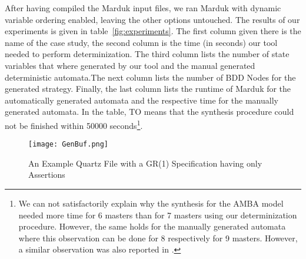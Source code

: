 \documentclass[submission,copyright,creativecommons]{eptcs}
\begin{document}
After having compiled the Marduk input files, we ran Marduk with dynamic variable ordering enabled, leaving the other options untouched. The results of our experiments is given in table~\ref{fig:experiments}. The first column given there is the name of the case study, the second column is the time (in seconds) our tool needed to perform determinization. The third column lists the number of state variables that where generated by our tool and the manual generated deterministic automata.The next column lists the number of BDD Nodes for the generated strategy. Finally, the last column lists the runtime of Marduk for the automatically generated automata and the respective time for the manually generated automata. In the table, TO means that the synthesis procedure could not be finished within 50000 seconds\footnote{We can not satisfactorily explain why the synthesis for the AMBA model needed more time for 6  masters than for 7 masters using our determinization procedure. However, the same holds for the manually generated automata where this observation can be done for 8 respectively for 9 masters. However, a similar observation was also reported in \cite{BGJP07a}.}.



\begin{figure}
\texttt{[image: GenBuf.png]}
\caption{An Example Quartz File with a GR(1) Specification having only Assertions}
\label{fig:example_spec}	
\end{figure}
\end{document}
